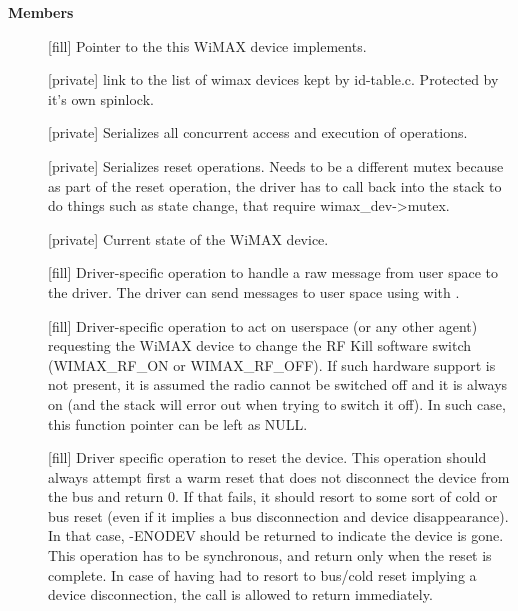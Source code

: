 \documentclass[a4paper,8pt,english]{sphinxmanual}
\begin{document}
\textbf{Members}
\begin{description}
\item[{}] \leavevmode
{[}fill{]} Pointer to the {\hyperref[networking/kapi:c.net_device]{\emph{}}} this WiMAX
device implements.

\item[{}] \leavevmode
{[}private{]} link to the list of wimax devices kept by
id-table.c. Protected by it's own spinlock.

\item[{}] \leavevmode
{[}private{]} Serializes all concurrent access and execution of
operations.

\item[{}] \leavevmode
{[}private{]} Serializes reset operations. Needs to be a
different mutex because as part of the reset operation, the
driver has to call back into the stack to do things such as
state change, that require wimax\_dev-\textgreater{}mutex.

\item[{}] \leavevmode
{[}private{]} Current state of the WiMAX device.

\item[{}] \leavevmode
{[}fill{]} Driver-specific operation to
handle a raw message from user space to the driver. The
driver can send messages to user space using with
.

\item[{}] \leavevmode
{[}fill{]} Driver-specific operation to act on
userspace (or any other agent) requesting the WiMAX device to
change the RF Kill software switch (WIMAX\_RF\_ON or
WIMAX\_RF\_OFF).
If such hardware support is not present, it is assumed the
radio cannot be switched off and it is always on (and the stack
will error out when trying to switch it off). In such case,
this function pointer can be left as NULL.

\item[{}] \leavevmode
{[}fill{]} Driver specific operation to reset the
device.
This operation should always attempt first a warm reset that
does not disconnect the device from the bus and return 0.
If that fails, it should resort to some sort of cold or bus
reset (even if it implies a bus disconnection and device
disappearance). In that case, -ENODEV should be returned to
indicate the device is gone.
This operation has to be synchronous, and return only when the
reset is complete. In case of having had to resort to bus/cold
reset implying a device disconnection, the call is allowed to
return immediately.


\end{description}
\end{document}

